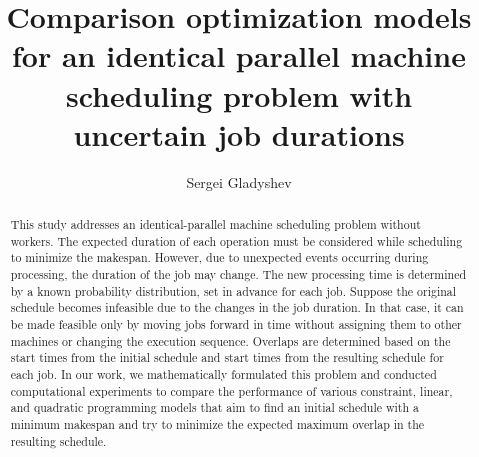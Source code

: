 \documentclass[12pt]{llncs}
\begin{document}
\fi

\title{Comparison optimization models for an identical
parallel machine scheduling problem with\\ uncertain job
durations
}

\author{Sergei Gladyshev
}

\maketitle

\begin{abstract}
This study addresses an identical-parallel machine scheduling problem without workers. The expected duration of each operation must be considered while
scheduling to minimize the makespan. However, due to unexpected events occurring during processing, the duration of the job may change. The new processing
time is determined by a known probability distribution, set in advance for each
job. Suppose the original schedule becomes infeasible due to the changes in the
job duration. In that case, it can be made feasible only by moving jobs forward
in time without assigning them to other machines or changing the execution sequence. Overlaps are determined based on the start times from the initial schedule
and start times from the resulting schedule for each job. In our work, we mathematically formulated this problem and conducted computational experiments to
compare the performance of various constraint, linear, and quadratic programming
models that aim to find an initial schedule with a minimum makespan and try to
minimize the expected maximum overlap in the resulting schedule.

\end{abstract}


\end{document}
